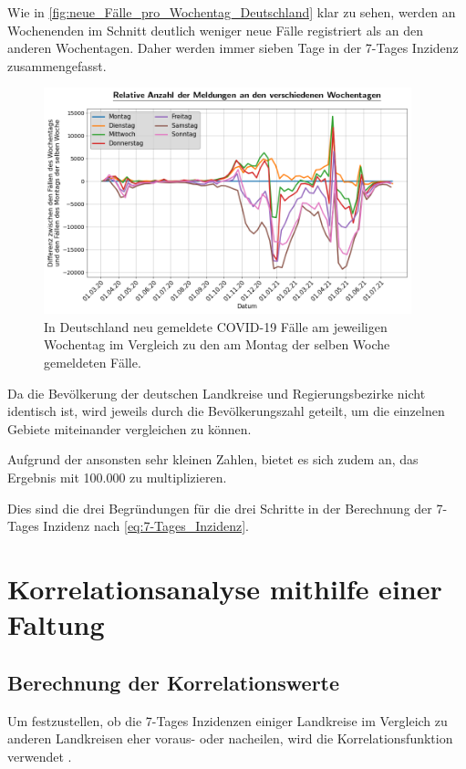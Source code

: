 Wie in \autoref{fig:neue_Fälle_pro_Wochentag_Deutschland} klar zu sehen, werden an Wochenenden im Schnitt deutlich weniger neue Fälle registriert als an den anderen Wochentagen.
Daher werden immer sieben Tage in der 7-Tages Inzidenz zusammengefasst.
\begin{figure}[H]
    \centering
    \includegraphics[width=0.95\textwidth]{figures/Grundlagen/neue_Fälle_pro_Wochentag_Deutschland.png}
    \caption{In Deutschland neu gemeldete COVID-19 Fälle am jeweiligen Wochentag im Vergleich zu den am Montag der selben Woche gemeldeten Fälle.}
    \label{fig:neue_Fälle_pro_Wochentag_Deutschland}
\end{figure}
Da die Bevölkerung der deutschen Landkreise und Regierungsbezirke nicht identisch ist, wird jeweils durch die Bevölkerungszahl geteilt, um die einzelnen Gebiete miteinander vergleichen zu können.

Aufgrund der ansonsten sehr kleinen Zahlen, bietet es sich zudem an, das Ergebnis mit 100.000 zu multiplizieren.

Dies sind die drei Begründungen für die drei Schritte in der Berechnung der 7-Tages Inzidenz nach \autoref{eq:7-Tages_Inzidenz}.


\section{Korrelationsanalyse mithilfe einer Faltung}\label{sec:BeschreibungKorrelationsanalyse}

\subsection{Berechnung der Korrelationswerte}\label{sec:Grundlagen:BerechnungderKorrelationwertes}
Um festzustellen, ob die 7-Tages Inzidenzen einiger Landkreise im Vergleich zu anderen Landkreisen eher voraus- oder nacheilen, wird die Korrelationsfunktion verwendet \autocite{Korrelation}.

